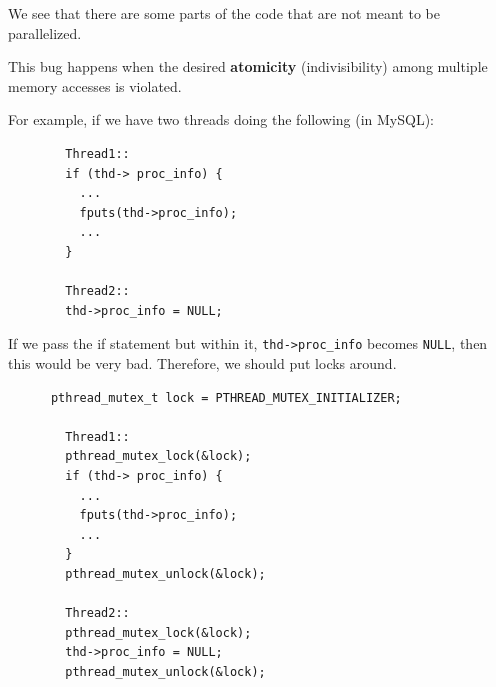 \documentclass{article}
\begin{document}
    We see that there are some parts of the code that are not meant to be parallelized. 

    \begin{definition} 
      This bug happens when the desired \textbf{atomicity} (indivisibility) among multiple memory accesses is violated. 
    \end{definition}

    \begin{example}
      For example, if we have two threads doing the following (in MySQL): 
      \begin{lstlisting}
        Thread1:: 
        if (thd-> proc_info) {
          ...
          fputs(thd->proc_info); 
          ...
        }

        Thread2::
        thd->proc_info = NULL; 
      \end{lstlisting}
      If we pass the if statement but within it, \texttt{thd->proc\_info} becomes \texttt{NULL}, then this would be very bad. Therefore, we should put locks around. 
      \begin{lstlisting}
      pthread_mutex_t lock = PTHREAD_MUTEX_INITIALIZER; 

        Thread1:: 
        pthread_mutex_lock(&lock); 
        if (thd-> proc_info) {
          ...
          fputs(thd->proc_info); 
          ...
        }
        pthread_mutex_unlock(&lock); 

        Thread2::
        pthread_mutex_lock(&lock); 
        thd->proc_info = NULL; 
        pthread_mutex_unlock(&lock); 
      \end{lstlisting}
    \end{example}
\end{document}
